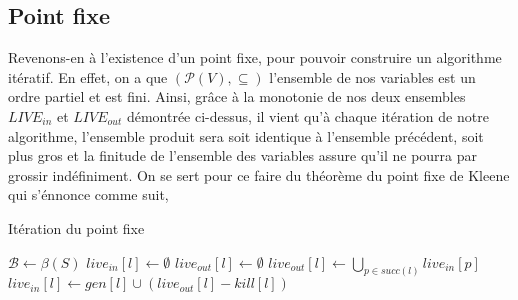 \documentclass[a4paper, 12pt]{article}
\begin{document}
\subsection{Point fixe}
Revenons-en à l'existence d'un point fixe, pour pouvoir construire un algorithme itératif. En effet,
on a que $(\mathcal{P}(V), \subseteq)$ l'ensemble de nos variables est un ordre partiel et est fini.
Ainsi, grâce à la monotonie de nos deux ensembles $LIVE_{in}$ et $LIVE_{out}$ démontrée ci-dessus, il
vient qu'à chaque itération de notre algorithme, l'ensemble produit sera soit identique à l'ensemble précédent,
soit plus gros et la finitude de l'ensemble des variables assure qu'il ne pourra par grossir indéfiniment. On se sert pour ce faire
du théorème du point fixe de Kleene qui s'énnonce comme suit,
\newline
\newline
{}
\begin{algorithm}
	\caption{Itération du point fixe}
	\begin{algorithmic}
		\State $\mathcal{B} \leftarrow \beta(S)$
		\State $live_{in}[l] \leftarrow \emptyset$
		\State $live_{out}[l] \leftarrow \emptyset$
		\EndFor
		\State $live_{out}[l] \leftarrow \bigcup\limits_{p\in succ(l)} live_{in}[p]$
		\State $live_{in}[l] \leftarrow gen[l] \cup (live_{out}[l] - kill[l])$
		\EndFor
		\EndWhile
	\end{algorithmic}
\end{algorithm}
\end{document}
